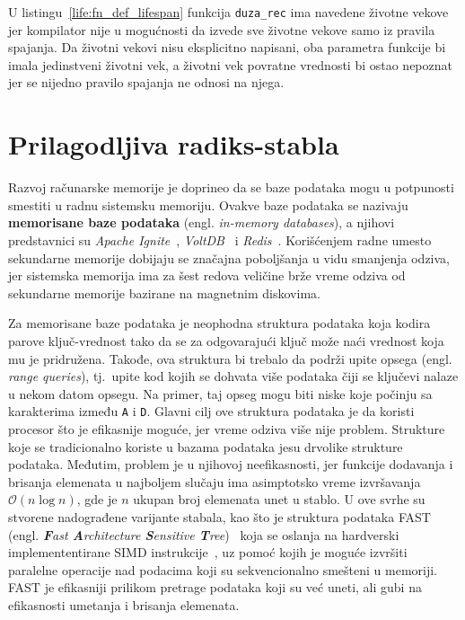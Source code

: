 \documentclass[12pt,oneside]{memoir}
\begin{document}
U listingu~\ref{life:fn_def_lifespan} funkcija \texttt{duza\_rec} ima navedene životne
vekove jer kompilator nije u mogućnosti da izvede sve životne vekove samo iz
pravila spajanja. Da životni vekovi nisu eksplicitno napisani, oba parametra funkcije
bi imala jedinstveni životni vek, a životni vek povratne vrednosti bi ostao nepoznat
jer se nijedno pravilo spajanja ne odnosi na njega.


\chapter{Prilagodljiva radiks-stabla}

Razvoj računarske memorije je doprineo da se baze podataka
mogu u potpunosti smestiti u radnu sistemsku memoriju. Ovakve baze podataka se nazivaju
\textbf{memorisane baze podataka} (engl. \emph{in-memory databases}), a njihovi predstavnici su
\emph{Apache Ignite}~\cite{apacheIgnite}, \emph{VoltDB}~\cite{voltDB} i
\emph{Redis}~\cite{redis}. Korišćenjem radne umesto sekundarne
memorije dobijaju se značajna poboljšanja u vidu smanjenja odziva, jer sistemska memorija
ima za šest redova veličine brže vreme odziva
od sekundarne memorije bazirane na magnetnim diskovima.

Za memorisane baze podataka je neophodna struktura podataka koja kodira parove
ključ-vrednost tako da se za odgovarajući ključ može naći vrednost koja mu
je pridružena. Takođe, ova struktura bi trebalo da podrži upite opsega
(engl. \emph{range queries}), tj.\ upite kod kojih se dohvata više podataka
čiji se ključevi nalaze u nekom datom opsegu.
Na primer, taj opseg mogu biti niske koje počinju sa karakterima između
\texttt{A} i \texttt{D}.
Glavni cilj ove struktura podataka je da koristi procesor što je efikasnije moguće, jer
vreme odziva više nije problem. Strukture koje se tradicionalno koriste u bazama podataka jesu
drvolike strukture podataka. Međutim, problem je u njihovoj neefikasnosti, jer
funkcije dodavanja i brisanja elemenata u najboljem slučaju ima asimptotsko vreme izvršavanja
$ \mathcal{O}(n\log{}n) $, gde je $n$ ukupan broj elemenata unet u stablo.
U ove svrhe su stvorene nadograđene varijante stabala,
kao što je struktura podataka FAST
(engl. \emph{\textbf{F}ast \textbf{A}rchitecture \textbf{S}ensitive \textbf{T}ree})~\cite{fast}
koja se oslanja na hardverski implemententirane SIMD instrukcije~\cite{simd},
uz pomoć kojih je moguće izvršiti paralelne operacije nad podacima koji su
sekvencionalno smešteni u memoriji.
FAST je efikasniji prilikom pretrage podataka koji su već uneti,
ali gubi na efikasnosti umetanja i brisanja elemenata.
\end{document}
